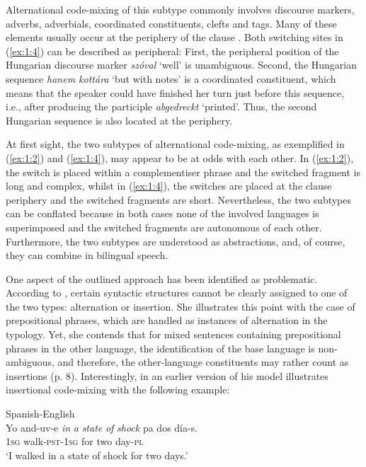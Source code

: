 \noindent Alternational code-mixing of this subtype commonly involves discourse markers, adverbs, adverbials, coordinated constituents, clefts and tags. Many of these elements usually occur at the periphery of the clause \citep[97--99]{muysken-bilingual-2000}. Both switching sites in (\ref{ex:1:4}) can be described as peripheral: First, the peripheral position of the Hungarian discourse marker \textit{szóval} `well' is unambiguous. Second, the Hungarian sequence \textit{hanem kottára} `but with notes' is a coordinated constituent, which means that the speaker could have finished her turn just before this sequence, i.e., after producing the participle \textit{abgedreckt} `printed'. Thus, the second Hungarian sequence is also located at the periphery.

At first sight, the two subtypes of alternational code-mixing, as exemplified in (\ref{ex:1:2}) and (\ref{ex:1:4}), may appear to be at odds with each other. In (\ref{ex:1:2}), the switch is placed within a complementiser phrase and the switched fragment is long and complex, whilst in (\ref{ex:1:4}), the switches are placed at the clause periphery and the switched fragments are short. Nevertheless, the two subtypes can be conflated because in both cases none of the involved languages is superimposed and the switched fragments are autonomous of each other. Furthermore, the two subtypes are understood as abstractions, and, of course, they can combine in bilingual speech.

One aspect of the outlined approach has been identified as problematic. According to \citet[][7]{muhamedowa-untersuchung-2006}, certain syntactic structures cannot be clearly assigned to one of the two types: alternation or insertion. She illustrates this point with the case of prepositional phrases, which are handled as instances of alternation in the typology. Yet, she contends that for mixed sentences containing prepositional phrases in the other language, the identification of the base language is non-ambiguous, and therefore, the other-language constituents may rather count as insertions (p. 8). Interestingly, in an earlier version of his model \citet{muysken-code-switching-1997} illustrates insertional code-mixing with the following example:

\ea{\label{ex:1:5}}
Spanish-English \citep[296]{pfaff-1979}\\
\gll Yo and-uv-e \textit{in} \textit{a} \textit{state} \textit{of} \textit{shock} pa dos día-s.\\
 \textsc{1sg} walk-\textsc{pst-1sg} {} {} {} {} {} for two day-\textsc{pl}\\
\glt `I walked in a state of shock for two days.' 
\glend
\z


